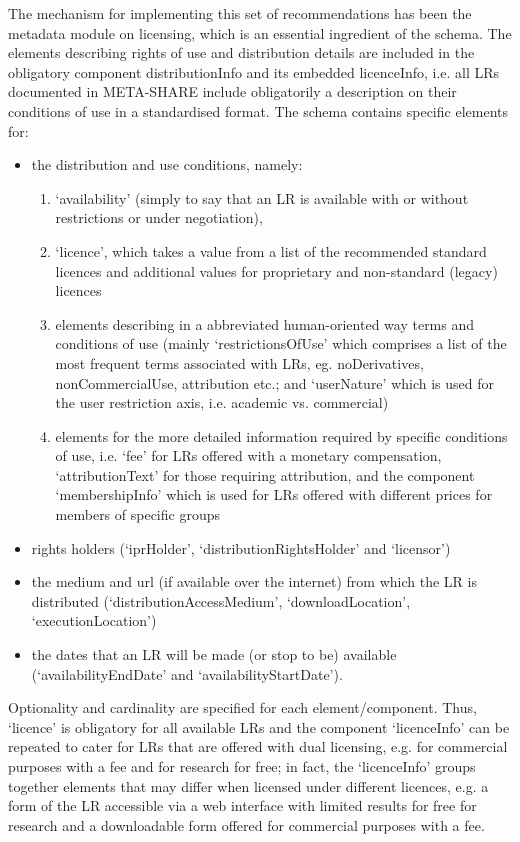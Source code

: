 \documentclass{llncs}
\begin{document}
{The mechanism for implementing this set of recommendations has been the metadata module on licensing, which is an essential ingredient of the schema. The elements describing rights of use and distribution details are included in the obligatory component distributionInfo and its embedded licenceInfo, i.e. all LRs documented in META-SHARE include obligatorily a description on their conditions of use in a standardised format. The schema contains specific elements for:
\begin{itemize}
\item the distribution and use conditions, namely:
	\begin{enumerate}
	\item `availability' (simply to say that an LR is available with or without restrictions or under negotiation), 
	\item `licence', which takes a value from a list of the recommended standard licences and  additional values for proprietary and non-standard (legacy) licences
	\item elements describing in a abbreviated human-oriented way terms and
            conditions of use (mainly `restrictionsOfUse' which comprises a list
            of the most frequent terms associated with LRs, eg. noDerivatives,
            nonCommercialUse, attribution etc.; and `userNature' which is used for the user restriction axis, i.e. academic vs. commercial)
	\item elements for the more detailed information required by specific
            conditions of use, i.e. `fee' for LRs offered with a monetary
            compensation, `attributionText' for those requiring attribution, and
            the component  `membershipInfo' which is used for LRs offered with different prices for members of specific groups
	\end{enumerate}
\item rights holders (`iprHolder', `distributionRightsHolder' and `licensor')
\item the medium and url (if available over the internet) from which the LR is
    distributed (`distributionAccessMedium', `downloadLocation', `executionLocation')
\item the dates that an LR will be made (or stop to be) available
    (`availabilityEndDate' and `availabilityStartDate').
\end{itemize}
Optionality and cardinality are specified for each element/component. Thus,
`licence' is obligatory for all available LRs and the component `licenceInfo'
can be repeated to cater for LRs that are offered with dual licensing, e.g. for
commercial purposes with a fee and for research for free; in fact, the `licenceInfo' groups together elements that may differ when licensed under different licences, e.g. a form of the LR accessible via a web interface with limited results for free for research and a downloadable form offered for commercial purposes with a fee.

}
\end{document}
